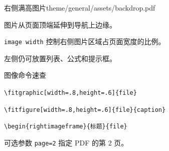 \begin{rightimageframe}[image width=.40]{右侧满高图片}{theme/general/assets/backdrop.pdf}
      \begin{description}[高度]
            \item[高度] 图片从页面顶端延伸到导航上边缘。
            \item[宽度] \texttt{image width} 控制右侧图片区域占页面宽度的比例。
            \item[正文] 左侧仍可放置列表、公式和提示框。
      \end{description}
\end{rightimageframe}

\begin{frame}[fragile]{图像命令速查}
      \begin{description}[适配素材]
            \item[适配素材] \verb|\fitgraphic[width=.8,height=.6]{file}|
            \item[添加图注] \verb|\fitfigure[width=.8,height=.6]{file}{caption}|
            \item[右侧图片] \verb|\begin{rightimageframe}{标题}{file}|
            \item[PDF 页面] 可选参数 \texttt{page=2} 指定 PDF 的第 2 页。
      \end{description}
\end{frame}
